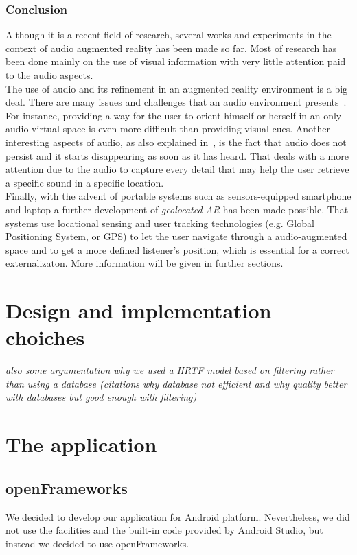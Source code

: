 \documentclass[journal]{IEEEtran}
\begin{document}
\subsubsection{Conclusion}
Although it is a recent field of research, several works and experiments in the context of audio augmented reality has been made so far. Most of research has been done mainly on the use of visual information with very little attention paid to the audio aspects.\\ 
The use of audio and its refinement in an augmented reality environment is a big deal. There are many issues and challenges that an audio environment presents~\cite{}. For instance, providing a way for the user to orient himself or herself in an only-audio virtual space is even more difficult than providing visual cues. Another interesting aspects of audio, as also explained in~\cite{}, is the fact that audio does not persist and it starts disappearing as soon as it has heard. That deals with a more attention due to the audio to capture every detail that may help the user retrieve a specific sound in a specific location.\\
Finally, with the advent of portable systems such as sensors-equipped smartphone and laptop a further development of \emph{geolocated AR} has been made possible. That systems use locational sensing and user tracking technologies (e.g. Global Positioning System, or GPS) to let the user navigate through a audio-augmented space and to get a more defined listener's position, which is essential for a correct externalizaton. More information will be given in further sections.

	
\section{Design and implementation choiches}	
\textit{also some argumentation why we used a HRTF model based on filtering rather than using a database (citations why database not efficient and why quality better with databases but good enough with filtering)}
\section{The application}
\subsection{openFrameworks}
We decided to develop our application for Android platform. Nevertheless, we did not use the facilities and the built-in code provided by Android Studio, but instead we decided to use openFrameworks. 
\end{document}
